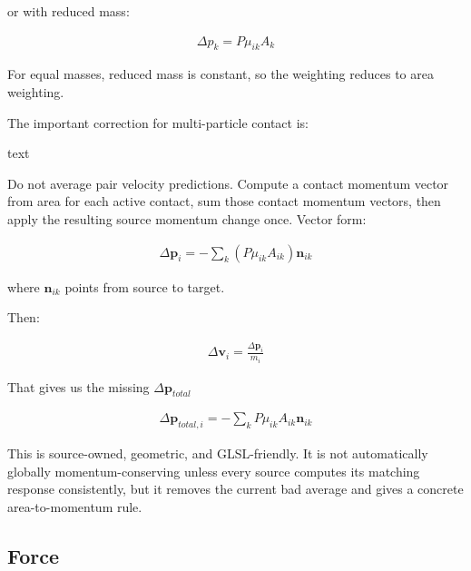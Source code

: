 or with reduced mass:

\begin{equation}
\begin{aligned}
\label{none}
\Delta p_k = P \mu_{ik} A_k
\end{aligned}
\end{equation}

For equal masses, reduced mass is constant, so the weighting reduces to area weighting.

The important correction for multi-particle contact is:

text


Do not average pair velocity predictions.
Compute a contact momentum vector from area for each active contact,
sum those contact momentum vectors,
then apply the resulting source momentum change once.
Vector form:


\begin{equation}
\begin{aligned}
\label{none}
\Delta \mathbf{p}_{i}=-\sum_k\left(P \mu_{ik} A_{ik}\right)\mathbf{n}_{ik}
\end{aligned}
\end{equation}

where $\mathbf{n}_{ik}$ points from source to target.

Then:

\begin{equation}
\begin{aligned}
\label{none}
\Delta \mathbf{v}_{i}=\frac{\Delta \mathbf{p}_{i}}{m_i}
\end{aligned}
\end{equation}

That gives us the missing $\Delta \mathbf{p}_{total}$

\begin{equation}
\begin{aligned}
\label{none}
\Delta \mathbf{p}_{total,i}=-\sum_k P \mu_{ik} A_{ik} \mathbf{n}_{ik}
\end{aligned}
\end{equation}


This is source-owned, geometric, and GLSL-friendly. It is not automatically globally momentum-conserving unless every source computes its matching response consistently, but it removes the current bad average and gives a concrete area-to-momentum rule.







\subsection{Force}

